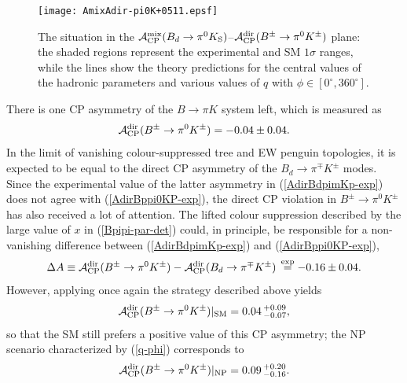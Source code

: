 \documentclass[11pt]{cernrep}
\begin{document}
\begin{figure}
\begin{center}
\texttt{[image: AmixAdir-pi0K+0511.epsf]}
\end{center}
\vspace*{-0.5truecm}
\caption{The situation in the 
${\cal A}_{\rm CP}^{\rm mix}(B_d\to\pi^0K_{\rm S})$--${\cal A}_{\rm CP}^{\rm dir}
(B^\pm\to\pi^0K^\pm)$ plane:  the shaded regions represent the experimental
and SM $1 \sigma$ ranges, while the lines show the
theory predictions for the central values of the hadronic parameters
and various values of $q$ with 
$\phi\in[0^\circ,360^\circ]$.\label{fig:Adirpi0KS-Amixpi0K+}}
\end{figure}

There is one CP asymmetry of the $B\to\pi K$ system left,  
which is measured as 
\begin{equation}\label{AdirBppi0KP-exp}
{\cal A}_{\rm CP}^{\rm dir}(B^\pm\to\pi^0K^\pm) =
-0.04\pm 0.04.
\end{equation}
In the limit of vanishing colour-suppressed tree and EW penguin topologies,
it is expected to be equal to the direct CP asymmetry of the $B_d\to\pi^\mp K^\pm$
modes. Since the experimental value of the latter asymmetry in 
(\ref{AdirBdpimKp-exp}) does not agree with (\ref{AdirBppi0KP-exp}), the 
direct CP violation in $B^\pm\to\pi^0K^\pm$ has also received
a lot of attention. The lifted colour suppression described by the large value of 
$x$ in (\ref{Bpipi-par-det}) could, in principle, be responsible for a non-vanishing
difference between (\ref{AdirBdpimKp-exp}) and (\ref{AdirBppi0KP-exp}),
\begin{equation}
\Delta A \equiv {\cal A}_{\rm CP}^{\rm dir}(B^\pm\to\pi^0K^\pm)
               -{\cal A}_{\rm CP}^{\rm dir}(B_d\to\pi^\mp K^\pm)\,\stackrel{{\rm exp}}{=} 
                -0.16\pm0.04.  \label{DeltaA}
\end{equation}
However, applying once again the strategy described above yields
\begin{equation}\label{AdirBppi0KP-SM}
{\cal A}_{\rm CP}^{\rm dir}(B^\pm\to\pi^0K^\pm)|_{\rm SM} 
= 0.04\,^{+0.09}_{-0.07},
\end{equation}
so that the SM still prefers a positive value of this CP asymmetry; 
the NP scenario characterized by (\ref{q-phi}) corresponds to 
\begin{equation}\label{AdirBppi0KP-NP}
{\cal A}_{\rm CP}^{\rm dir}(B^\pm\to\pi^0K^\pm)|_{\rm NP}
= 0.09\,^{+0.20}_{-0.16}.
\end{equation}
\end{document}
